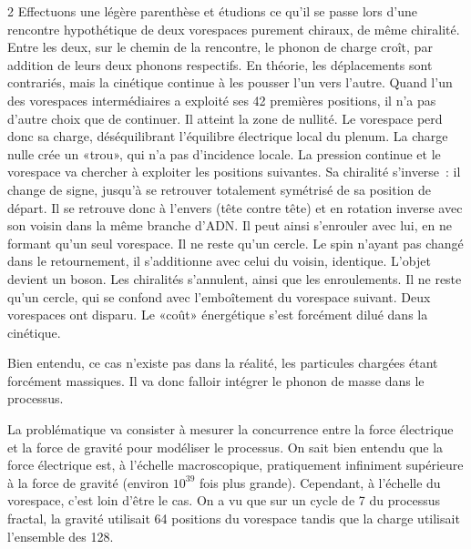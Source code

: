 \begin{multicols}{2}
Effectuons une légère parenthèse et étudions ce qu'il se passe lors
d'une rencontre hypothétique de deux vorespaces purement chiraux, de
même chiralité. Entre les deux, sur le chemin de la rencontre, le
phonon de charge croît, par addition de leurs deux phonons respectifs.
En théorie, les déplacements sont contrariés, mais la cinétique
continue à les pousser l'un vers l'autre. Quand l'un des vorespaces
intermédiaires a exploité ses 42 premières positions, il n'a pas d'autre
choix que de continuer. Il atteint la zone de nullité. Le vorespace
perd donc sa charge, déséquilibrant l'équilibre électrique local du
plenum. La charge nulle crée un «trou», qui n'a pas d'incidence
locale. La pression continue et le vorespace va chercher à exploiter
les positions suivantes. Sa chiralité s'inverse : il change de signe,
jusqu'à se retrouver totalement symétrisé de sa position de départ. Il
se retrouve donc à l'envers (tête contre tête) et en rotation inverse
avec son voisin dans la même branche d'ADN. Il peut ainsi s'enrouler
avec lui, en ne formant qu'un seul vorespace. Il ne reste qu'un
cercle. Le spin n'ayant pas changé dans le retournement, il
s'additionne avec celui du voisin, identique. L'objet devient un
boson. Les chiralités s'annulent, ainsi que les enroulements. Il ne
reste qu'un cercle, qui se confond avec l'emboîtement du vorespace
suivant. Deux vorespaces ont disparu. Le «coût» énergétique s'est
forcément dilué dans la cinétique.

Bien entendu, ce cas n'existe pas dans la réalité, les particules
chargées étant forcément massiques. Il va donc falloir intégrer le
phonon de masse dans le processus.

La problématique va consister à mesurer la concurrence entre la force
électrique et la force de gravité pour modéliser le processus. On sait
bien entendu que la force électrique est, à l'échelle macroscopique,
pratiquement infiniment supérieure à la force de gravité (environ $10^{39}$
fois plus grande). Cependant, à l'échelle du vorespace, c'est loin
d'être le cas. On a vu que sur un cycle de 7 du processus fractal, la
gravité utilisait 64 positions du vorespace tandis que la charge
utilisait l'ensemble des 128.


\end{multicols}
